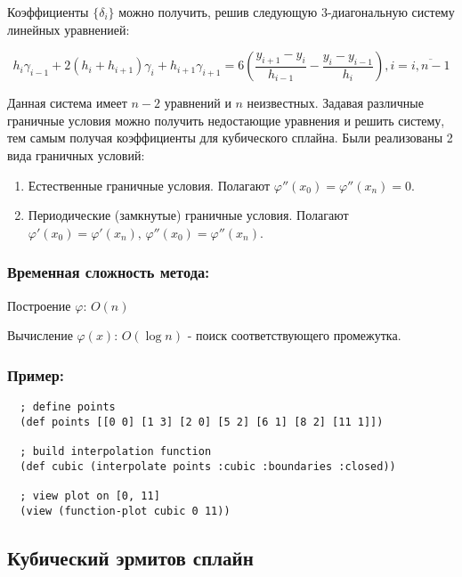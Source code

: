 Коэффициенты $\{\delta_i\}$ можно получить, решив следующую 3-диагональную систему линейных уравненией:

\begin{equation}
  h_i \gamma_{i-1} + 2(h_i + h_{i+1})\gamma_i + h_{i+1}\gamma_{i+1} =
  6 (\frac{y_{i+1} - y_i}{h_{i-1}} - \frac{y_i - y_{i-1}}{h_i}), i = \overline{i, n - 1}
\end{equation}

Данная система имеет $n-2$ уравнений и $n$ неизвестных. Задавая различные граничные условия можно получить недостающие уравнения и решить систему, тем самым получая коэффициенты для кубического сплайна. Были реализованы 2 вида граничных условий:

\begin{enumerate}
\item Естественные граничные условия. Полагают $\varphi''(x_0)= \varphi''(x_n)=0$.
\item Периодические (замкнутые) граничные условия. Полагают $\varphi'(x_0)=\varphi'(x_n),\, \varphi''(x_0)=\varphi''(x_n)$.
\end{enumerate}

\subsubsection{Временная сложность метода:}

Построение $\varphi$: $O(n)$

Вычисление $\varphi(x)$: $O(\log n)$ - поиск соответствующего промежутка.

\subsubsection{Пример:}

\begin{verbatim}
  ; define points
  (def points [[0 0] [1 3] [2 0] [5 2] [6 1] [8 2] [11 1]])

  ; build interpolation function
  (def cubic (interpolate points :cubic :boundaries :closed))

  ; view plot on [0, 11]
  (view (function-plot cubic 0 11))
\end{verbatim}



\subsection{Кубический эрмитов сплайн}

